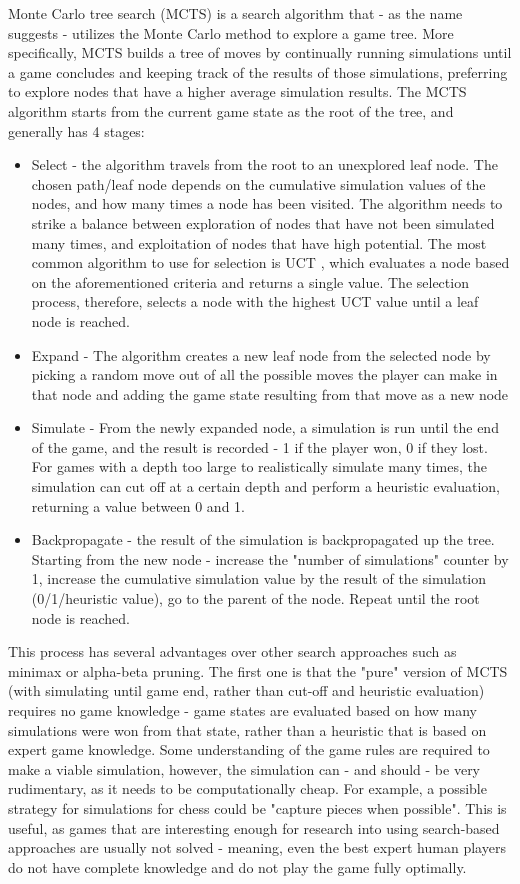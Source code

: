 Monte Carlo tree search (MCTS) \cite{Coulom2007MonteCarlo} is a search algorithm that - as the name suggests - utilizes the Monte Carlo method to explore a game tree. More specifically, MCTS builds a tree of moves by continually running simulations until a game concludes and keeping track of the results of those simulations, preferring to explore nodes that have a higher average simulation results. The MCTS algorithm starts from the current game state as the root of the tree, and generally has 4 stages:
\begin{itemize}
\item Select - the algorithm travels from the root to an unexplored leaf node. The chosen path/leaf node depends on the cumulative simulation values of the nodes, and how many times a node has been visited. The algorithm needs to strike a balance between exploration of nodes that have not been simulated many times, and exploitation of nodes that have high potential. The most common algorithm to use for selection is UCT \cite{kocsis2006bandit}, which evaluates a node based on the aforementioned criteria and returns a single value. The selection process, therefore, selects a node with the highest UCT value until a leaf node is reached.
\item Expand - The algorithm creates a new leaf node from the selected node by picking a random move out of all the possible moves the player can make in that node and adding the game state resulting from that move as a new node
\item Simulate - From the newly expanded node, a simulation is run until the end of the game, and the result is recorded - 1 if the player won, 0 if they lost. For games with a depth too large to realistically simulate many times, the simulation can cut off at a certain depth and perform a heuristic evaluation, returning a value between 0 and 1.
\item Backpropagate - the result of the simulation is backpropagated up the tree. Starting from the new node - increase the "number of simulations" counter by 1, increase the cumulative simulation value by the result of the simulation (0/1/heuristic value), go to the parent of the node. Repeat until the root node is reached.
\end{itemize}

This process has several advantages over other search approaches such as minimax or alpha-beta pruning. The first one is that the "pure" version of MCTS (with simulating until game end, rather than cut-off and heuristic evaluation) requires no game knowledge - game states are evaluated based on how many simulations were won from that state, rather than a heuristic that is based on expert game knowledge. Some understanding of the game rules are required to make a viable simulation, however, the simulation can - and should - be very rudimentary, as it needs to be computationally cheap. For example, a possible strategy for simulations for chess could be "capture pieces when possible". This is useful, as games that are interesting enough for research into using search-based approaches are usually not solved - meaning, even the best expert human players do not have complete knowledge and do not play the game fully optimally.


